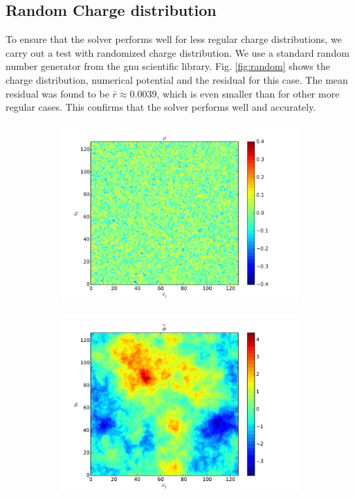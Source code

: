 	\subsection{Random Charge distribution}
		To ensure that the solver performs well for less regular charge distributions, we carry out a test with
 		randomized charge distribution. We use a standard random number generator from
 		the gnu scientific library. Fig. \ref{fig:random} shows the
		charge distribution, numerical potential and the residual for this case. The mean residual was
		found to be \(\bar{r} \approx 0.0039\), which is even smaller than for other more regular
		cases. This confirms that the solver performs well and accurately.
		\begin{figure}
			\centering
			\begin{subfigure}[b]{0.6\textwidth}
				\includegraphics[width = \textwidth]{figures/verification/analytical/random/rho-1}
			\end{subfigure}
			\begin{subfigure}[b]{0.6\textwidth}
				\includegraphics[width = \textwidth]{figures/verification/analytical/random/numerical.pdf}

\end{subfigure}
\end{figure}
